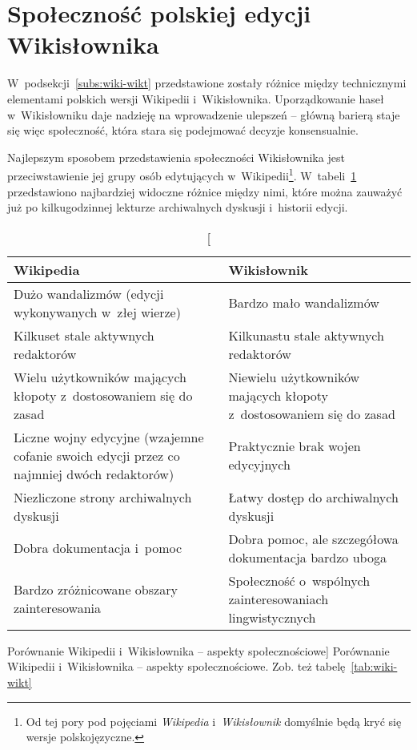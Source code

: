 \section{Społeczność polskiej edycji Wikisłownika}
\label{sec:plsoc}
W~podsekcji~\ref{subs:wiki-wikt} przedstawione zostały różnice między technicznymi elementami polskich wersji Wikipedii i~Wikisłownika. Uporządkowanie haseł w~Wikisłowniku daje nadzieję na wprowadzenie ulepszeń -- główną barierą staje się więc społeczność, która stara się podejmować decyzje konsensualnie.

Najlepszym sposobem przedstawienia społeczności Wikisłownika jest przeciwstawienie jej grupy osób edytujących w~Wikipedii\footnote{Od tej pory pod pojęciami \emph{Wikipedia} i~\emph{Wikisłownik} domyślnie będą kryć się wersje polskojęzyczne.}. W~tabeli~\ref{tab:wiki-wikt2} przedstawiono najbardziej widoczne różnice między nimi, które można zauważyć już po kilkugodzinnej lekturze archiwalnych dyskusji i~historii edycji.

\begin{table}[h]
\begin{center}
	\begin{tabularx}{\textwidth}{ XX }
		\toprule \textbf{Wikipedia} & \textbf{Wikisłownik} \\
		\midrule Dużo wandalizmów (edycji wykonywanych w~złej wierze)
			& Bardzo mało wandalizmów \\
		\midrule Kilkuset stale aktywnych redaktorów
			& Kilkunastu stale aktywnych redaktorów \\
		\midrule Wielu użytkowników mających kłopoty z~dostosowaniem się do zasad
			& Niewielu użytkowników mających kłopoty z~dostosowaniem się do zasad \\
		\midrule Liczne wojny edycyjne (wzajemne cofanie swoich edycji przez co najmniej dwóch redaktorów)
			& Praktycznie brak wojen edycyjnych \\
		\midrule Niezliczone strony archiwalnych dyskusji
			& Łatwy dostęp do archiwalnych dyskusji \\
		\midrule Dobra dokumentacja i~pomoc
			& Dobra pomoc, ale szczegółowa dokumentacja bardzo uboga \\
		\midrule Bardzo zróżnicowane obszary zainteresowania
			& Społeczność o~wspólnych zainteresowaniach lingwistycznych \\
		\bottomrule
	\end{tabularx}
\caption
	[Porównanie Wikipedii i~Wikisłownika -- aspekty społecznościowe]
	{Porównanie Wikipedii i~Wikisłownika -- aspekty społecznościowe. Zob. też tabelę~\ref{tab:wiki-wikt}}
\label{tab:wiki-wikt2}
\end{center}
\end{table}

